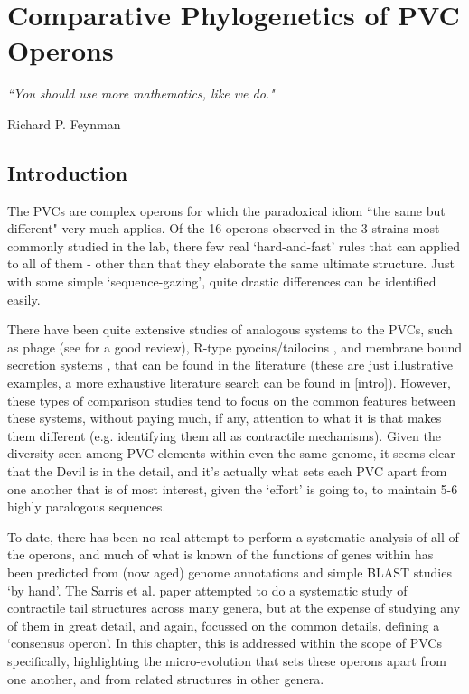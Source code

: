 \pagestyle{IHA-fancy-style}


\chapter{Comparative Phylogenetics of PVC Operons}\label{bioinformatics}

\epigraph{\textit{``You should use more mathematics, like we do."}}{Richard P. Feynman}

\section{Introduction}
The PVCs are complex operons for which the paradoxical idiom ``the same but different" very much applies. Of the 16 operons  observed in the 3 strains most commonly studied in the lab, there few real `hard-and-fast' rules that can applied to all of them - other than that they elaborate the same ultimate structure. Just with some simple `sequence-gazing', quite drastic differences can be identified easily.

There have been quite extensive studies of analogous systems to the PVCs, such as phage (see \citep{Yap2014} for a good review), R-type pyocins/tailocins \citep{Ge2015, Ghequire2015}, and membrane bound secretion systems \citep{Cascales2012}, that can be found in the literature \citep{Sarris2014, Kube2015} (these are just illustrative examples, a more exhaustive literature search can be found in \vref{intro}). However, these types of comparison studies tend to focus on the common features between these systems, without paying much, if any, attention to what it is that makes them different (e.g. identifying them all as contractile mechanisms). Given the diversity seen among PVC elements within even the same genome, it seems clear that the Devil is in the detail, and it's actually what sets each PVC apart from one another that is of most interest, given the `effort' \Pa{} is going to, to maintain 5-6 highly paralogous sequences.

To date, there has been no real attempt to perform a systematic analysis of all of the operons, and much of what is known of the functions of genes within has been predicted from (now aged) genome annotations and simple BLAST studies `by hand'. The Sarris et al. paper attempted to do a systematic study of contractile tail structures across many genera, but at the expense of studying any of them in great detail, and again, focussed on the common details, defining a `consensus operon'. In this chapter, this is addressed within the scope of PVCs specifically, highlighting the micro-evolution that sets these operons apart from one another, and from related structures in other genera.

